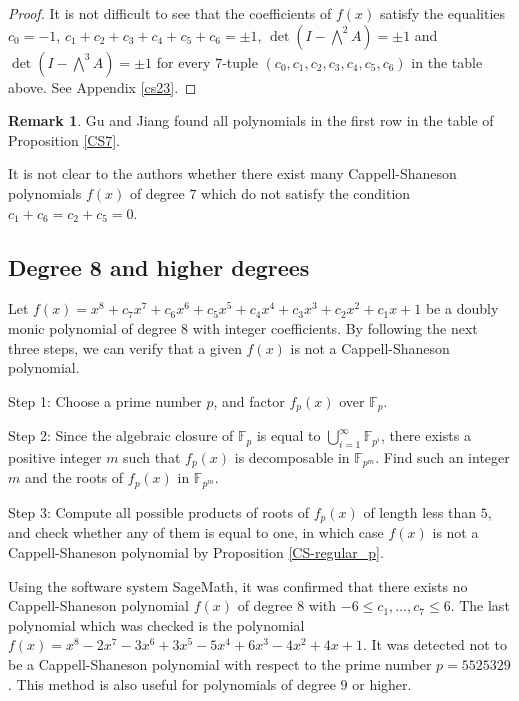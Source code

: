 \documentclass{amsart}
\theoremstyle{plain}
\theoremstyle{definition}
\newtheorem{rem}[thm]{Remark}
\theoremstyle{remark}
\begin{document}
\begin{proof}
It is not difficult to see that the coefficients of $f(x)$ 
satisfy the equalities $c_0=-1$, $c_1+c_2+c_3+c_4+c_5+c_6=\pm 1$, 
$\det(I-\bigwedge^2A)=\pm 1$ and $\det(I-\bigwedge^3A)=\pm 1$ 
for every $7$-tuple $(c_0,c_1,c_2,c_3,c_4,c_5,c_6)$ in the table above. 
See Appendix \ref{cs23}. 
\end{proof}

\begin{rem}
Gu and Jiang \cite{GJ1999} found 
all polynomials in the first row in the table of Proposition \ref{CS7}. 
\end{rem}

It is not clear to the authors whether 
there exist many Cappell-Shaneson polynomials $f(x)$ of degree $7$ 
which do not satisfy the condition $c_1+c_6=c_2+c_5=0$. 

\subsection{Degree $\boldsymbol{8}$ and higher degrees}

Let $f(x)=x^8+c_7x^7+c_6x^6+c_5x^5+c_4x^4+c_3x^3+c_2x^2+c_1x+1$ be 
a doubly monic polynomial of degree $8$ with integer coefficients. 
By following the next three steps, 
we can verify that a given $f(x)$ is not a Cappell-Shaneson polynomial. 

Step 1: Choose a prime number $p$, and factor $f_p(x)$ over $\mathbb{F}_p$. 

Step 2: Since the algebraic closure of $\mathbb{F}_p$ is equal to $\bigcup_{i=1}^{\infty}\mathbb{F}_{p^i}$, 
there exists a positive integer $m$ such that $f_p(x)$ is decomposable in $\mathbb{F}_{p^m}$. 
Find such an integer $m$ and the roots of $f_p(x)$ in $\mathbb{F}_{p^m}$. 

Step 3: Compute all possible products of roots of $f_p(x)$ of length less than $5$, 
and check whether any of them is equal to one, in which case $f(x)$ is not a Cappell-Shaneson polynomial 
by Proposition \ref{CS-regular_p}. 

Using the software system {\sf SageMath}, it was confirmed that there exists 
no Cappell-Shaneson polynomial $f(x)$ of degree $8$ with $-6\leq c_1,\ldots ,c_7\leq 6$. 
The last polynomial which was checked is the polynomial $f(x)=x^8-2x^7-3x^6+3x^5-5x^4+6x^3-4x^2+4x+1$. 
It was detected not to be a Cappell-Shaneson polynomial with respect to the prime number 
$p=5525329$. This method is also useful for polynomials of degree $9$ or higher. 
\end{document}
